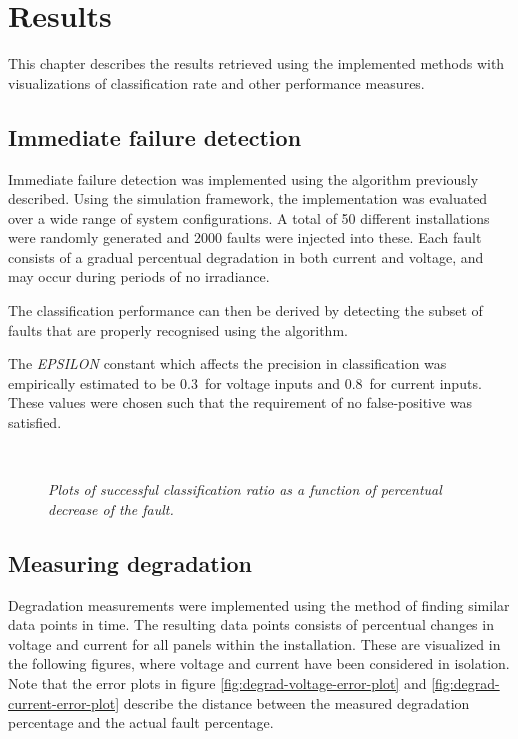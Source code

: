 \chapter{Results}
This chapter describes the results retrieved using the implemented methods with visualizations of classification rate and other performance measures.

\section{Immediate failure detection}
Immediate failure detection was implemented using the algorithm previously described.
Using the simulation framework, the implementation was evaluated over a wide range of system configurations.
A total of 50 different installations were randomly generated and 2000 faults were injected into these.
Each fault consists of a gradual percentual degradation in both current and voltage, and may occur during periods of no irradiance.

The classification performance can then be derived by detecting the subset of faults that are properly recognised using the algorithm.

The \emph{EPSILON} constant which affects the precision in classification was empirically estimated to be $0.3$ for voltage inputs and $0.8$ for current inputs.
These values were chosen such that the requirement of no false-positive was satisfied.

\begin{figure}[here]
\centering
{}
~
\caption[Immediate failure detection performance]{\emph{
   Plots of successful classification ratio as a function of percentual decrease of the fault.
}}
\end{figure}

\clearpage
\section{Measuring degradation}
Degradation measurements were implemented using the method of finding similar data points in time.
The resulting data points consists of percentual changes in voltage and current for all panels within the installation.
These are visualized in the following figures, where voltage and current have been considered in isolation.
Note that the error plots in figure \ref{fig:degrad-voltage-error-plot} and \ref{fig:degrad-current-error-plot} describe the distance between the measured degradation percentage and the actual fault percentage.

